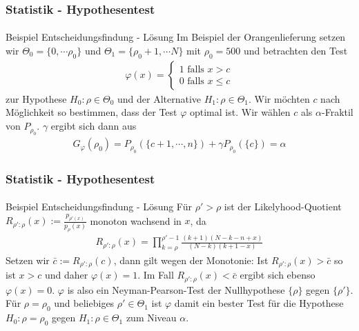 \documentclass{beamer}
\begin{document}
\begin{frame}
    \frametitle{Statistik - Hypothesentest}
\framesubtitle{}


\begin{block}{Beispiel Entscheidungsfindung - Lösung}
Im Beispiel der Orangenlieferung  setzen wir $\Theta_0 = \{ 0, \cdots \rho_0 \}$ und $\Theta_1 = \{\rho_0 +1 , \cdots N \}$ mit $\rho_0 = 500$ und betrachten den Test
\begin{align*}
 \varphi(x) = \begin{cases} 1 \text{ falls } x > c \\ 0 \text{ falls } x \leq c  \end{cases}
\end{align*}
zur Hypothese $H_0: \rho \in \Theta_0$ und der Alternative $H_1: \rho \in \Theta_1$. 
Wir möchten $c$ nach Möglichkeit  so bestimmen, dass der Test $\varphi$ optimal ist. Wir wählen  $c$ als $\alpha$-Fraktil von $P_{\rho_0}$.  $\gamma$ ergibt sich dann aus
\begin{align*}
G_{\varphi}(\rho_0) = P_{\rho_0} (\{ c+1, \cdots, n \}) + \gamma  P_{\rho_0}(\{ c\}) = \alpha 
\end{align*}
\end{block}

 \end{frame}


\begin{frame}
    \frametitle{Statistik - Hypothesentest}
\framesubtitle{}

\begin{block}{Beispiel Entscheidungsfindung - Lösung}
Für $\rho' > \rho$ ist der Likelyhood-Quotient  $R_{\rho' : \rho} (x):= \frac{p_{\rho' (x)}}{p_{\rho}(x)}$ monoton wachsend in $x$, da
\begin{align*}
R_{\rho' : \rho} (x)= \prod_{k = \rho}^{\rho'-1} \frac{(k+1)(N -k -n +x)}{(N-k) (k+1 -x)}
\end{align*}
Setzen wir  $\bar{c}:= R_{\rho' : \rho} (c)$, dann gilt wegen der Monotonie: Ist $R_{\rho' : \rho} (x) > \bar{c}$ so ist $ x >c$ und daher $\varphi(x) = 1$. Im Fall  $R_{\rho' : \rho} (x) < \bar{c}$ ergibt sich ebenso $\varphi(x) = 0$. $\varphi$ is also ein Neyman-Pearson-Test der Nullhypothese $\{\rho\}$ gegen $\{\rho' \}$. Für $\rho = \rho_0$ und beliebiges $\rho' \in \Theta_1$ ist $\varphi$ damit ein bester Test für die Hypothese $H_0: \rho = \rho_0$ gegen  $H_1: \rho \in  \Theta_1$ zum Niveau $\alpha$.

\end{block}

 \end{frame}
\end{document}
